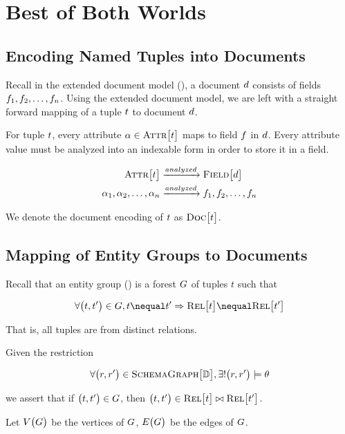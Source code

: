 \chapter{Best of Both Worlds}
	\section{Encoding Named Tuples into Documents}
	\label{sec:named-tuples-documents}
		Recall in the extended document model (), a document $d$ consists of fields $f_1, f_2, \dotsc, f_n$.  Using the extended document model, we are left with a straight forward mapping of a tuple $t$ to document $d$.
		
		For tuple $t$, every attribute $\alpha \in \textsc{Attr}\bigl[t\bigr]$ maps to field $f$ in $d$.	Every attribute value must be analyzed into an indexable form in order to store it in a field.
		
		\begin{align}
			\textsc{Attr}\bigl[t\bigr] &\xrightarrow{analyzed} \textsc{Field}\bigl[d\bigr] \\
			\alpha_1, \alpha_2, \dotsc, \alpha_n &\xrightarrow{analyzed} f_1, f_2, \dotsc, f_n
		\end{align}
		
		We denote the document encoding of $t$ as $\textsc{Doc}\bigl[t\bigr]$.
	
	\section{Mapping of Entity Groups to Documents}
		Recall that an entity group () is a forest $G$ of tuples $t$ such that
		
		\[
			\forall \bigl(\tuple, \tuple'\bigr) \in \egraph, \tuple \nequal \tuple' \Rightarrow \relations{\tuple} \nequal \relations{\tuple'}
		\]
		
		That is, all tuples are from distinct relations.
		
		Given the restriction
		
		\[
			\forall \bigl(r, r'\bigr) \in \textsc{SchemaGraph}\bigl[\mathbb{D}\bigr], \exists! \bigl(r, r'\bigr) \models \theta
		\]
		
		we assert that if $\bigl(t, t'\bigr) \in G$, then $\bigl(t, t'\bigr) \in \textsc{Rel}\bigl[t\bigr] \bowtie \textsc{Rel}\bigl[t'\bigr]$.
		
		Let $V\bigl(G\bigr)$ be the vertices of $G$, $E\bigl(G\bigr)$ be the edges of $G$.
		
